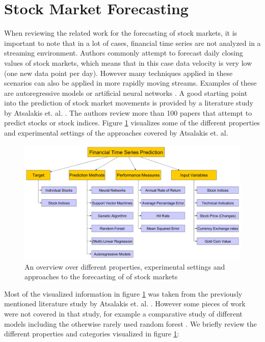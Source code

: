 \section{Stock Market Forecasting}
\label{sec_stock_market_prediction}
When reviewing the related work for the forecasting of stock markets, it is important to note that in a lot of cases, financial time series are not analyzed in a streaming environment. Authors commonly attempt to forecast daily closing values of stock markets, which means that in this case data velocity is very low (one new data point per day). However many techniques applied in these scenarios can also be applied in more rapidly moving streams. Examples of these are autoregressive models \cite{terasvirta1994specification} or artificial neural networks \cite{gama2010knowledge}. \newline
A good starting point into the prediction of stock market movements is provided by a literature study by Atsalakis et. al. \cite{atsalakis2009surveying}. The authors review more than 100 papers that attempt to predict stocks or stock indices. Figure \ref{fig_financialTimeSeriesPredictionOverview} visualizes some of the different properties and experimental settings of the approaches covered by Atsalakis et. al.

\begin{figure}[h]
	\centering
  	\includegraphics[width=\textwidth]{financialTimeSeriesPredictionOverview}
	\caption{An overview over different properties, experimental settings and approaches to the forecasting of of stock markets}
	\label{fig_financialTimeSeriesPredictionOverview}
\end{figure}

Most of the visualized information in figure \ref{fig_financialTimeSeriesPredictionOverview} was taken from the previously mentioned literature study by Atsalakis et. al. \cite{atsalakis2009surveying}. However  some pieces of work were not covered in that study, for example a comparative study of different models including the otherwise rarely used random forest \cite{kumar2006forecasting}. We briefly review the different properties and categories visualized in figure 
\ref{fig_financialTimeSeriesPredictionOverview}:

